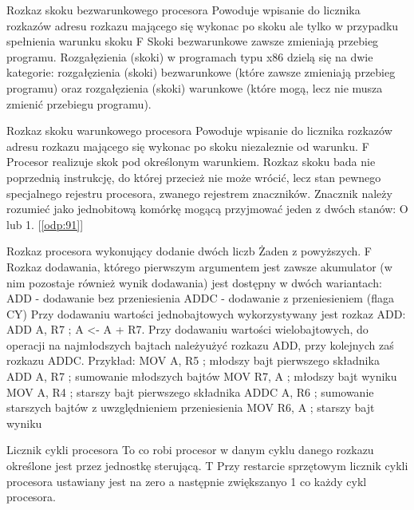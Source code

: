 \label{odp:101}
\answer
{Rozkaz skoku bezwarunkowego procesora}
{Powoduje wpisanie do licznika rozkazów adresu rozkazu mającego się wykonac po skoku ale tylko w przypadku spełnienia warunku skoku}
{F}
{
Skoki bezwarunkowe zawsze zmieniają przebieg programu.
}
{
Rozgałęzienia (skoki) w programach typu x86 dzielą się na dwie kategorie: rozgałęzienia (skoki) bezwarunkowe (które zawsze zmieniają przebieg programu) oraz rozgałęzienia (skoki) warunkowe (które mogą, lecz nie musza zmienić przebiegu programu).
}

\label{odp:102}
\answer
{Rozkaz skoku warunkowego procesora}
{Powoduje wpisanie do licznika rozkazów adresu rozkazu mającego się wykonac po skoku niezaleznie od warunku.}
{F}
{
Procesor realizuje skok pod określonym warunkiem. Rozkaz skoku bada nie poprzednią instrukcję, do której przecież nie może wrócić, lecz stan pewnego specjalnego rejestru procesora, zwanego rejestrem znaczników.
}
{
Znacznik należy rozumieć jako jednobitową komórkę mogącą przyjmować jeden z dwóch stanów: O lub 1.
[\ref{odp:91}]
}

\label{odp:103}
\answer
{Rozkaz procesora wykonujący dodanie dwóch liczb}
{Żaden z powyższych.}
{F}
{
Rozkaz dodawania, którego pierwszym argumentem jest zawsze akumulator (w nim pozostaje również wynik dodawania) jest dostępny w dwóch wariantach:
ADD - dodawanie bez przeniesienia
ADDC - dodawanie z przeniesieniem (flaga CY)
}
{
Przy dodawaniu wartości jednobajtowych wykorzystywany jest rozkaz ADD:
ADD A, R7 ; A <- A + R7.
Przy dodawaniu wartości wielobajtowych, do operacji na najmłodszych bajtach należyużyć rozkazu ADD, przy kolejnych zaś rozkazu ADDC. Przykład:
MOV A, R5 ; młodszy bajt pierwszego składnika
ADD A, R7 ; sumowanie młodszych bajtów
MOV R7, A ; młodszy bajt wyniku
MOV A, R4 ; starszy bajt pierwszego składnika
ADDC A, R6 ; sumowanie starszych bajtów z uwzględnieniem przeniesienia
MOV R6, A ; starszy bajt wyniku
}

\label{odp:104}
\answer
{Licznik cykli procesora}
{To co robi procesor w danym cyklu danego rozkazu określone jest przez jednostkę sterującą.}
{T}
{
Przy restarcie sprzętowym licznik cykli procesora ustawiany jest na zero a następnie zwiększanyo 1 co każdy cykl procesora.
}
{
}

